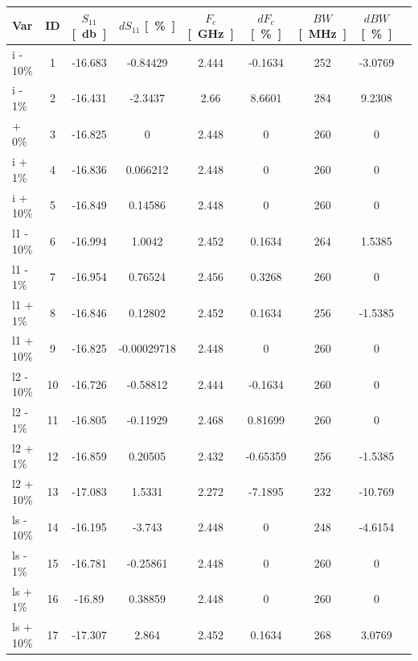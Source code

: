 \documentclass[Deriaz_Traiber_Labo02]{subfiles}
\begin{document}
\begin{table}[H]
\centering
\begin{tabular}{|l|c|cc|cc|cc|c|}\hline
	Var 		   	& ID  &  $S_{11}$ \si{[\decibel]} &  $dS_{11}$ \si{[\percent]}   &  $F_c$ \si{[\giga\hertz]} &   $dF_c$ \si{[\percent]}  & $BW$\si{[\mega\hertz]} &   $dBW$ \si{[\percent]}\\ \hline\hline
       i - 10\%    &  1  &  -16.683  &     -0.84429  &  2.444   &   -0.1634  &   252  & -3.0769\\
    i - 1\%     &  2  &  -16.431  &      -2.3437  &   2.66   &    8.6601  &   284  &  9.2308\\
    + 0\%       &  3  &  -16.825  &            0  &  2.448   &         0  &   260  &       0\\
    i + 1\%     &  4  &  -16.836  &     0.066212  &  2.448   &         0  &   260  &       0\\
    i + 10\%    &  5  &  -16.849  &      0.14586  &  2.448   &         0  &   260  &       0\\\hline
    l1 - 10\%   &  6  &  -16.994  &       1.0042  &  2.452   &    0.1634  &   264  &  1.5385\\
    l1 - 1\%    &  7  &  -16.954  &      0.76524  &  2.456   &    0.3268  &   260  &       0\\
    l1 + 1\%    &  8  &  -16.846  &      0.12802  &  2.452   &    0.1634  &   256  & -1.5385\\
    l1 + 10\%   &  9  &  -16.825  &  -0.00029718  &  2.448   &         0  &   260  &       0\\\hline
    l2 - 10\%   & 10  &  -16.726  &     -0.58812  &  2.444   &   -0.1634  &   260  &       0\\
    l2 - 1\%    & 11  &  -16.805  &     -0.11929  &  2.468   &   0.81699  &   260  &       0\\
    l2 + 1\%    & 12  &  -16.859  &      0.20505  &  2.432   &  -0.65359  &   256  & -1.5385\\
    l2 + 10\%   & 13  &  -17.083  &       1.5331  &  2.272   &   -7.1895  &   232  & -10.769\\\hline
    ls - 10\%   & 14  &  -16.195  &       -3.743  &  2.448   &         0  &   248  & -4.6154\\
    ls - 1\%    & 15  &  -16.781  &     -0.25861  &  2.448   &         0  &   260  &       0\\
    ls + 1\%    & 16  &   -16.89  &      0.38859  &  2.448   &         0  &   260  &       0\\
    ls + 10\%   & 17  &  -17.307  &        2.864  &  2.452   &    0.1634  &   268  &  3.0769\\\hline

\end{tabular}
\end{table}
\end{document}
